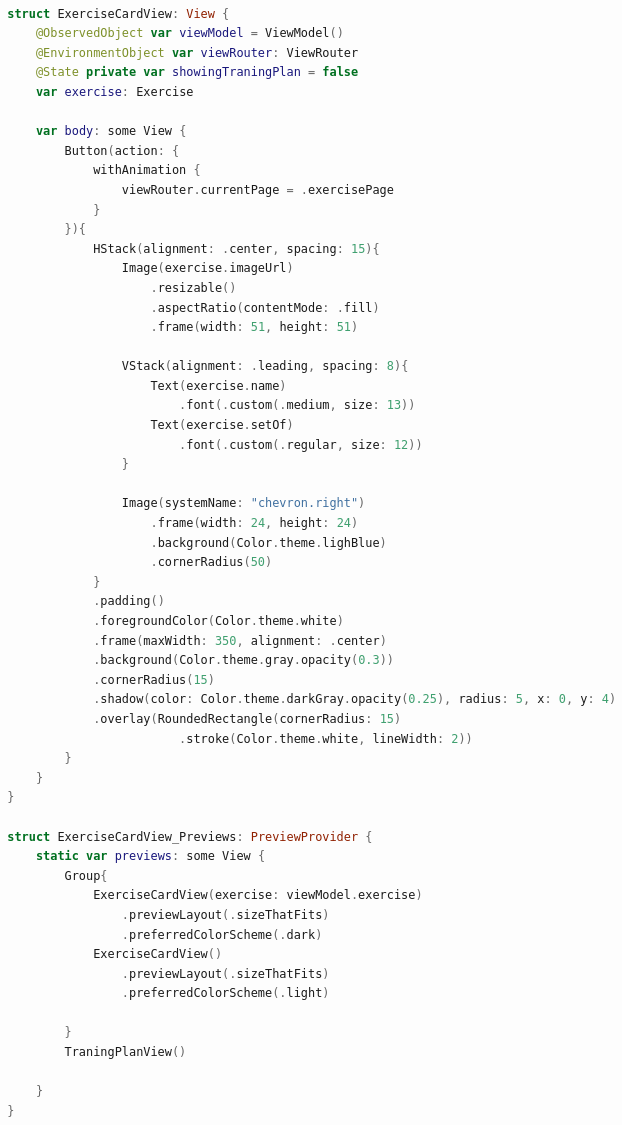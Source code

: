 \begin{spacing}{2}
\end{spacing}
\begin{minipage}{\textwidth}
    \linespread{0.8}\selectfont
    \begin{lstlisting}[language=swift]

        struct ExerciseCardView: View {
            @ObservedObject var viewModel = ViewModel()
            @EnvironmentObject var viewRouter: ViewRouter
            @State private var showingTraningPlan = false
            var exercise: Exercise
            
            var body: some View {
                Button(action: {
                    withAnimation {
                        viewRouter.currentPage = .exercisePage
                    }
                }){
                    HStack(alignment: .center, spacing: 15){
                        Image(exercise.imageUrl)
                            .resizable()
                            .aspectRatio(contentMode: .fill)
                            .frame(width: 51, height: 51)
                        
                        VStack(alignment: .leading, spacing: 8){
                            Text(exercise.name)
                                .font(.custom(.medium, size: 13))
                            Text(exercise.setOf)
                                .font(.custom(.regular, size: 12))
                        }
                        
                        Image(systemName: "chevron.right")
                            .frame(width: 24, height: 24)
                            .background(Color.theme.lighBlue)
                            .cornerRadius(50)
                    }
                    .padding()
                    .foregroundColor(Color.theme.white)
                    .frame(maxWidth: 350, alignment: .center)
                    .background(Color.theme.gray.opacity(0.3))
                    .cornerRadius(15)
                    .shadow(color: Color.theme.darkGray.opacity(0.25), radius: 5, x: 0, y: 4)
                    .overlay(RoundedRectangle(cornerRadius: 15)
                                .stroke(Color.theme.white, lineWidth: 2))
                }
            }
        }

        struct ExerciseCardView_Previews: PreviewProvider {
            static var previews: some View {
                Group{
                    ExerciseCardView(exercise: viewModel.exercise)
                        .previewLayout(.sizeThatFits)
                        .preferredColorScheme(.dark)
                    ExerciseCardView()
                        .previewLayout(.sizeThatFits)
                        .preferredColorScheme(.light)
                        
                }
                TraningPlanView()
                
            }
        }

    \end{lstlisting}   
\end{minipage}


